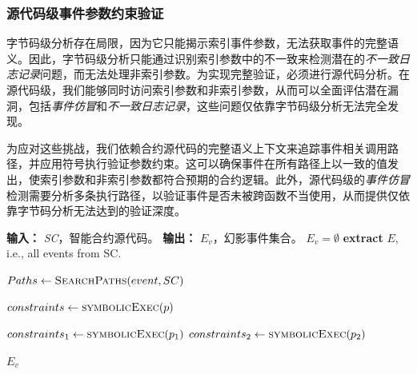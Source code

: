 \subsubsection{源代码级事件参数约束验证}

字节码级分析存在局限，因为它只能揭示索引事件参数，无法获取事件的完整语义。因此，字节码级分析只能通过识别索引参数中的不一致来检测潜在的\emph{不一致日志记录}问题，而无法处理非索引参数。为实现完整验证，必须进行源代码分析。在源代码级，我们能够同时访问索引参数和非索引参数，从而可以全面评估潜在漏洞，包括\emph{事件仿冒}和\emph{不一致日志记录}，这些问题仅依靠字节码级分析无法完全发现。

为应对这些挑战，我们依赖合约源代码的完整语义上下文来追踪事件相关调用路径，并应用符号执行验证参数约束。这可以确保事件在所有路径上以一致的值发出，使索引参数和非索引参数都符合预期的合约逻辑。此外，源代码级的\emph{事件仿冒}检测需要分析多条执行路径，以验证事件是否未被跨函数不当使用，从而提供仅依靠字节码分析无法达到的验证深度。

\begin{algorithm}
\footnotesize
  \caption{通过符号执行发现不一致日志记录与事件仿冒}\label{alg:source}
  \begin{algorithmic}[1]
    \Statex \textbf{输入：} \textit{SC}，智能合约源代码。
    \Statex \textbf{输出：} $E_v$，幻影事件集合。
      \State $E_v = \emptyset$
      \State \textbf{extract} $E$, i.e., all events from SC. \label{source:event}

        \State $Paths \gets \textsc{SearchPaths}({event, SC})$ 

          \State $constraints \gets \textsc{symbolicExec}({p})$
          \EndIf
        \EndFor

          \State $constraints_1 \gets \textsc{symbolicExec}({p_1})$
          \State $constraints_2 \gets \textsc{symbolicExec}({p_2})$

          \EndIf
        \EndFor
      \EndFor

      \State \Return $E_v$

  \end{algorithmic}
\end{algorithm}

